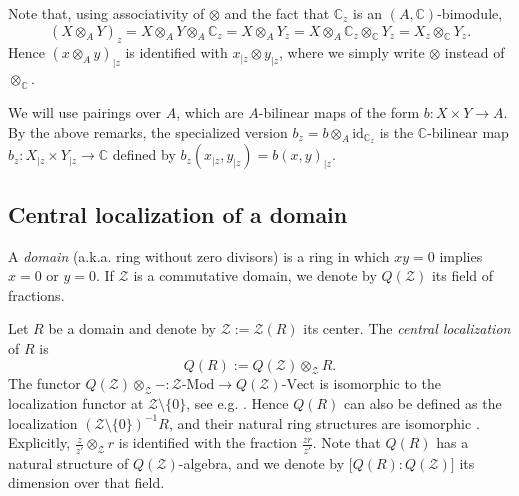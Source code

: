 \documentclass[11pt]{amsart}
\begin{document}
\smallskip

\indent Note that, using associativity of $\otimes$ and the fact that $\mathbb{C}_z$ is an $(A,\mathbb{C})$-bimodule,
\[ (X \otimes_A Y)_z = X \otimes_A Y \otimes_A \mathbb{C}_z = X \otimes_A Y_z = X \otimes_A \mathbb{C}_z \otimes_{\mathbb{C}} Y_z = X_z \otimes_{\mathbb{C}} Y_z. \]
Hence $(x \otimes_A y)_{|z}$ is identified with $x_{|z} \otimes y_{|z}$, where we simply write $\otimes$ instead of $\otimes_{\mathbb{C}}$.

\indent We will use pairings over $A$, which are $A$-bilinear maps of the form $b : X \times Y \to A$. By the above remarks, the specialized version $b_z = b \otimes_A \mathrm{id}_{\mathbb{C}_z}$ is the $\mathbb{C}$-bilinear map $b_z : X_{|z} \times Y_{|z} \to \mathbb{C}$ defined by $b_z(x_{|z}, y_{|z}) = b(x,y)_{|z}$.

\subsection{Central localization of a domain}\label{subsecCentralLoc}
A {\em domain} (a.k.a. ring without zero divisors) is a ring in which $xy=0$ implies $x=0$ or $y=0$. If $\mathcal{Z}$ is a commutative domain, we denote by $Q(\mathcal{Z})$ its field of fractions.

\indent Let $R$ be a domain and denote by $\mathcal{Z} := \mathcal{Z}(R)$ its center. The {\em central localization} of $R$ is
\[ Q(R) := Q(\mathcal{Z}) \otimes_{\mathcal{Z}} R. \]
The functor $Q(\mathcal{Z}) \otimes_{\mathcal{Z}} - : \mathcal{Z}\text{-}\mathrm{Mod} \to Q(\mathcal{Z})\text{-}\mathrm{Vect}$ is isomorphic to the localization functor at $\mathcal{Z}\setminus\! \{0\}$, see e.g. \cite[Prop.\,1.10.18]{Rowen}. Hence $Q(R)$ can also be defined as the localization $(\mathcal{Z}\setminus \{0\})^{-1}R$, and their natural ring structures are isomorphic \cite[Cor.\,1.10.18']{Rowen}. Explicitly, $\textstyle \frac{z}{z'} \otimes_{\mathcal{Z}} r$ is identified with the fraction $\textstyle \frac{zr}{z'}$. Note that $Q(R)$ has a natural structure of $Q(\mathcal{Z})$-algebra, and we denote by $\bigl[ Q(R):Q(\mathcal{Z}) \bigr]$ its dimension over that field.
\end{document}
